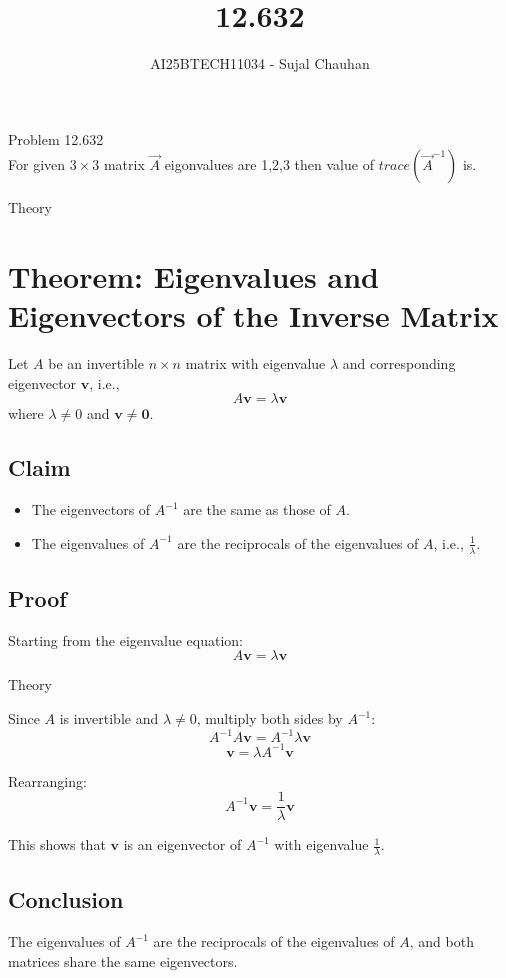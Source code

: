 \documentclass{beamer}
\title{12.632}
\author{AI25BTECH11034 - Sujal Chauhan}
\begin{document}
\frame{\titlepage}

\begin{frame}{Problem}
12.632\\
For given $3\times3$ matrix $\Vec{A}$ eigonvalues are 1,2,3 then value of $trace(\Vec{A}^{-1})$ is.

\end{frame}
\begin{frame}{Theory}


\section*{Theorem: Eigenvalues and Eigenvectors of the Inverse Matrix}

Let \(A\) be an invertible \(n \times n\) matrix with eigenvalue \(\lambda\) and corresponding eigenvector \(\mathbf{v}\), i.e.,
\[
A \mathbf{v} = \lambda \mathbf{v}
\]
where \(\lambda \neq 0\) and \(\mathbf{v} \neq \mathbf{0}.\)

\subsection*{Claim}

\begin{itemize}
    \item The eigenvectors of \(A^{-1}\) are the same as those of \(A\).
    \item The eigenvalues of \(A^{-1}\) are the reciprocals of the eigenvalues of \(A\), i.e., \(\frac{1}{\lambda}\).
\end{itemize}

\subsection*{Proof}

Starting from the eigenvalue equation:
\[
A \mathbf{v} = \lambda \mathbf{v}
\]
\end{frame}
\begin{frame}{Theory}
    
Since \(A\) is invertible and \(\lambda \neq 0\), multiply both sides by \(A^{-1}\):
\[
A^{-1} A \mathbf{v} = A^{-1} \lambda \mathbf{v}
\]
\[
\mathbf{v} = \lambda A^{-1} \mathbf{v}
\]

Rearranging:
\[
A^{-1} \mathbf{v} = \frac{1}{\lambda} \mathbf{v}
\]

This shows that \(\mathbf{v}\) is an eigenvector of \(A^{-1}\) with eigenvalue \(\frac{1}{\lambda}\).

\subsection*{Conclusion}

The eigenvalues of \(A^{-1}\) are the reciprocals of the eigenvalues of \(A\), and both matrices share the same eigenvectors.
\end{frame}
\end{document}
